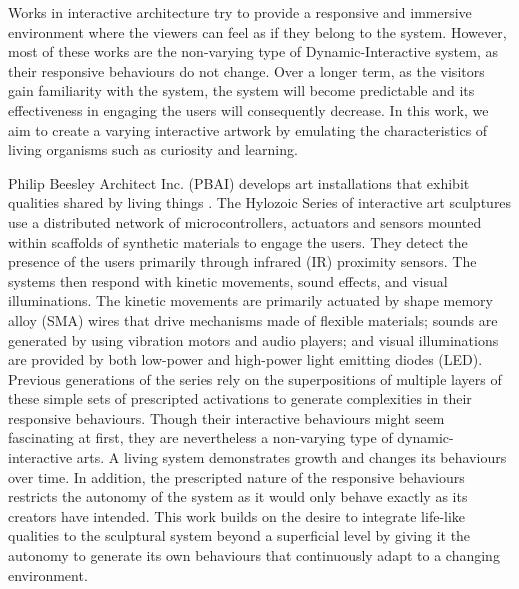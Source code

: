 Works in interactive architecture \cite{Beesley2010}\cite{Hangar.org} try to provide a responsive and immersive environment where the viewers can feel as if they belong to the system. %
However, most of these works are the non-varying type of Dynamic-Interactive system, as their responsive behaviours do not change. Over a longer term, as the visitors gain familiarity with the system, the system will become predictable and its effectiveness in engaging the users will consequently decrease. In this work, we aim to create a varying interactive artwork by emulating the characteristics of living organisms such as curiosity and learning. 

Philip Beesley Architect Inc. (PBAI) develops art installations that exhibit qualities shared by living things \cite{Gorbet2015}. The Hylozoic Series of interactive art sculptures use a distributed network of microcontrollers, actuators and sensors mounted within scaffolds of synthetic materials to engage the users. They detect the presence of the users primarily through infrared (IR) proximity sensors. The systems then respond with kinetic movements, sound effects, and visual illuminations. The kinetic movements are primarily actuated by shape memory alloy (SMA) wires that drive mechanisms made of flexible materials; sounds are generated by using vibration motors and audio players; and visual illuminations are provided by both low-power and high-power light emitting diodes (LED). Previous generations of the series \cite{Beesley2012} rely on the superpositions of multiple layers of these simple sets of prescripted activations to generate complexities in their responsive behaviours. %
Though their interactive behaviours might seem fascinating at first, they are nevertheless a non-varying type of dynamic-interactive arts. A living system demonstrates growth and changes its behaviours over time. In addition, the prescripted nature of the responsive behaviours restricts the autonomy of the system as it would only behave exactly as its creators have intended. This work builds on the desire to integrate life-like qualities to the sculptural system beyond a superficial level by giving it the autonomy to generate its own behaviours that continuously adapt to a changing environment.


